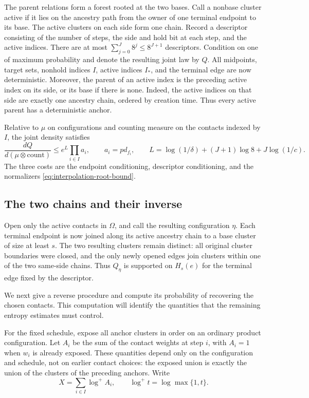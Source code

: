 The parent relations form a forest rooted at the two bases. Call a
nonbase cluster active if it lies on the ancestry path from the owner
of one terminal endpoint to its base. The active clusters on each side
form one chain. Record a descriptor consisting of the number of steps,
the side and hold bit at each step, and the active indices. There are
at most $\sum_{j=0}^J8^j\le8^{J+1}$ descriptors. Condition on one of
maximum probability and denote the resulting joint law by $Q$.
All midpoints, target sets, nonhold indices $I$, active indices $I_*$,
and the terminal edge are now deterministic. Moreover, the parent of
an active index is the preceding active index on its side, or its base
if there is none. Indeed, the active indices on that side are exactly
one ancestry chain, ordered by creation time. Thus every active parent
has a deterministic anchor.



Relative to $\mu$ on configurations and counting measure on the
contacts indexed by $I$, the joint density satisfies
\begin{equation}\label{eq:interpolation-density}
 \frac{dQ}{d(\mu\otimes\mathrm{count})}
 \le e^L\prod_{i\in I}a_i,
 \qquad a_i=pd_{f_i},
 \qquad
 L=\log(1/\delta)+(J+1)\log8+J\log(1/c).
\end{equation}
The three costs are the endpoint conditioning, descriptor conditioning,
and the normalizers \eqref{eq:interpolation-root-bound}.

\subsection{The two chains and their inverse}

Open only the active contacts in $\Omega$, and call the resulting
configuration $\eta$. Each terminal endpoint is now joined along its
active ancestry chain to a base cluster of size at least $s$. The two
resulting clusters remain distinct: all original cluster boundaries were
closed, and the only newly opened edges join clusters within one of the
two same-side chains. Thus $Q_\eta$ is supported on $H_s(e)$ for the
terminal edge fixed by the descriptor.

We next give a reverse procedure and compute its probability of recovering
the chosen contacts. This computation will identify the quantities that
the remaining entropy estimates must control.

For the fixed schedule, expose all anchor clusters in order on an
ordinary product configuration. Let $A_i$ be the sum of the contact
weights at step $i$, with $A_i=1$ when $w_i$ is already exposed. These
quantities depend only on the configuration and schedule, not on earlier
contact choices: the exposed union is exactly the union of the clusters
of the preceding anchors. Write
\[
 X=\sum_{i\in I}\log^+A_i,
 \qquad \log^+t=\log\max\{1,t\}.
\]

